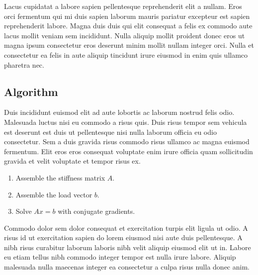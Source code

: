 Lacus cupidatat a labore sapien pellentesque reprehenderit elit a
nullam. Eros orci fermentum qui mi duis sapien laborum mauris pariatur
excepteur est sapien reprehenderit labore. Magna duis duis qui elit
consequat a felis ex commodo aute lacus mollit veniam sem incididunt.
Nulla aliquip mollit proident donec eros ut magna ipsum consectetur eros
deserunt minim mollit nullam integer orci. Nulla et consectetur ea felis
in aute aliquip tincidunt irure eiusmod in enim quis ullamco pharetra
nec.

\subsection{Algorithm}
Duis incididunt euismod elit ad aute lobortis ac laborum nostrud felis
odio. Malesuada luctus nisi eu commodo a risus quis. Duis risus tempor
sem vehicula est deserunt est duis ut pellentesque nisi nulla laborum
officia eu odio consectetur. Sem a duis gravida risus commodo risus
ullamco ac magna euismod fermentum. Elit eros eros consequat voluptate
enim irure officia quam sollicitudin gravida et velit voluptate et
tempor risus ex.
\begin{enumerate}
  \item Assemble the stiffness matrix $A$.
  \item Assemble the load vector $b$.
  \item Solve $A x = b$ with conjugate gradients.
\end{enumerate}
Commodo dolor sem dolor consequat et exercitation turpis elit ligula ut
odio. A risus id ut exercitation sapien do lorem eiusmod nisi aute duis
pellentesque. A nibh risus curabitur laborum laboris nibh velit aliquip
eiusmod elit ut in. Labore eu etiam tellus nibh commodo integer tempor
est nulla irure labore. Aliquip malesuada nulla maecenas integer ea
consectetur a culpa risus nulla donec anim.
